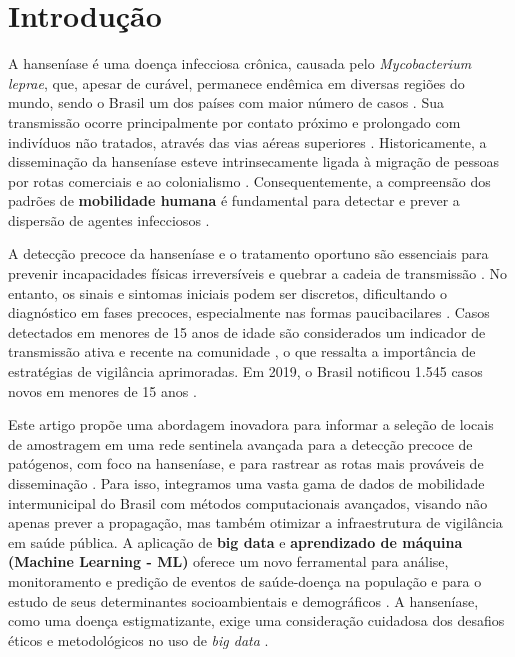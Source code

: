 \documentclass[preprint,12pt]{elsarticle}
\begin{document}

\section{Introdução}
A hanseníase é uma doença infecciosa crônica, causada pelo \textit{Mycobacterium leprae}, que, apesar de curável, permanece endêmica em diversas regiões do mundo, sendo o Brasil um dos países com maior número de casos \cite{inovacao2024computacional, ministerio2022protocolo, leprae2022causada}. Sua transmissão ocorre principalmente por contato próximo e prolongado com indivíduos não tratados, através das vias aéreas superiores \cite{inovacao2024modelagem, bacilo2022principal}. Historicamente, a disseminação da hanseníase esteve intrinsecamente ligada à migração de pessoas por rotas comerciais e ao colonialismo \cite{inovacao2024modelagem, roberts2018bioarchaeology, ministerio2022protocolo}. Consequentemente, a compreensão dos padrões de \textbf{mobilidade humana} é fundamental para detectar e prever a dispersão de agentes infecciosos \cite{oliveira2024summary, inovacao2024modelagem, lima2022climate, saldanha2021resumo}.

A detecção precoce da hanseníase e o tratamento oportuno são essenciais para prevenir incapacidades físicas irreversíveis e quebrar a cadeia de transmissão \cite{inovacao2024analise, hanseniase2022objetivos, saude2022equipes}. No entanto, os sinais e sintomas iniciais podem ser discretos, dificultando o diagnóstico em fases precoces, especialmente nas formas paucibacilares \cite{suspeicao2022diagnostica, inicial2022forma}. Casos detectados em menores de 15 anos de idade são considerados um indicador de transmissão ativa e recente na comunidade \cite{inovacao2024analise, hanseniase2022objetivos, crianca2022gravidade}, o que ressalta a importância de estratégias de vigilância aprimoradas. Em 2019, o Brasil notificou 1.545 casos novos em menores de 15 anos \cite{boletim2021epidemiologico}.

Este artigo propõe uma abordagem inovadora para informar a seleção de locais de amostragem em uma rede sentinela avançada para a detecção precoce de patógenos, com foco na hanseníase, e para rastrear as rotas mais prováveis de disseminação \cite{oliveira2024summary}. Para isso, integramos uma vasta gama de dados de mobilidade intermunicipal do Brasil com métodos computacionais avançados, visando não apenas prever a propagação, mas também otimizar a infraestrutura de vigilância em saúde pública. A aplicação de \textbf{big data} e \textbf{aprendizado de máquina (Machine Learning - ML)} oferece um novo ferramental para análise, monitoramento e predição de eventos de saúde-doença na população e para o estudo de seus determinantes socioambientais e demográficos \cite{inovacao2024computacional, mooney2018big, saldanha2021resumo, saldanha2021ambito}. A hanseníase, como uma doença estigmatizante, exige uma consideração cuidadosa dos desafios éticos e metodológicos no uso de \textit{big data} \cite{inovacao2024desafios, vanbrakel2019stigma}.
\end{document}
